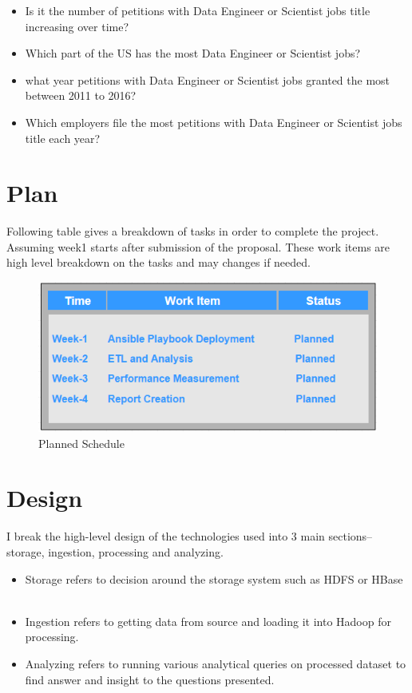 \documentclass[9pt,twocolumn,twoside]{../../styles/osajnl}
\begin{document}
\begin{itemize}
  \item Is it the number of petitions with Data Engineer or Scientist jobs title increasing over time?
  \item Which part of the US has the most Data Engineer or Scientist  jobs?
  \item what year petitions with Data Engineer or Scientist jobs granted the most between 2011 to 2016?
  \item  Which employers file the most petitions with Data Engineer or Scientist jobs title each year?
\end{itemize}


\section{Plan}
Following table gives a breakdown of tasks in order to complete the project. Assuming week1 starts after submission of the proposal. These work items are high level breakdown on the tasks and may changes if needed.

\begin{figure}[H]
 \centering
\includegraphics[scale=0.6]{images/image11}
\caption{Planned Schedule}
\end{figure}

\section{Design}

I break the high-level design of the technologies used into 3 main sections-- storage, ingestion, processing and analyzing. 

\begin{itemize}
  \item Storage refers to decision around the storage system such as HDFS or HBase ~\cite{wiki-hadoop}
  \item Ingestion refers to getting data from source and loading it into Hadoop for processing.
  \item Analyzing refers to running various analytical queries on processed dataset to find answer and insight to the questions presented. 
\end{itemize}
\end{document}
